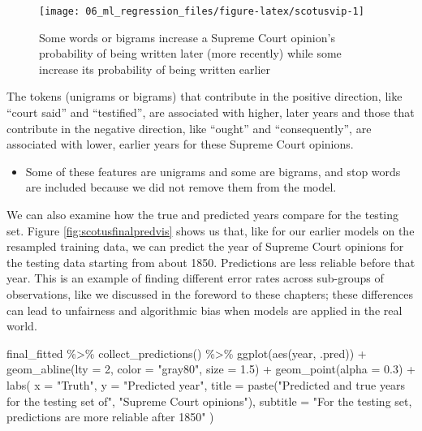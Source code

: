 \documentclass[
]{krantz}
\makeatletter
\newenvironment{Shaded}{\begin{snugshade}}{\end{snugshade}}
\newcommand{\AttributeTok}[1]{\textcolor[rgb]{0.77,0.63,0.00}{#1}}
\newcommand{\DecValTok}[1]{\textcolor[rgb]{0.00,0.00,0.81}{#1}}
\newcommand{\FloatTok}[1]{\textcolor[rgb]{0.00,0.00,0.81}{#1}}
\newcommand{\FunctionTok}[1]{\textcolor[rgb]{0.00,0.00,0.00}{#1}}
\newcommand{\NormalTok}[1]{#1}
\newcommand{\SpecialCharTok}[1]{\textcolor[rgb]{0.00,0.00,0.00}{#1}}
\newcommand{\StringTok}[1]{\textcolor[rgb]{0.31,0.60,0.02}{#1}}
\newenvironment{kframe}{%
\medskip{}
\setlength{\fboxsep}{.8em}
 \def\at@end@of@kframe{}%
 \ifinner\ifhmode%
  \def\at@end@of@kframe{\end{minipage}}%
  \begin{minipage}{\columnwidth}%
 \fi\fi%
 \def\FrameCommand##1{\hskip\@totalleftmargin \hskip-\fboxsep
 \colorbox{shadecolor}{##1}\hskip-\fboxsep
     \hskip-\linewidth \hskip-\@totalleftmargin \hskip\columnwidth}%
 \MakeFramed {\advance\hsize-\width
   \@totalleftmargin\z@ \linewidth\hsize
   \@setminipage}}%
 {\par\unskip\endMakeFramed%
 \at@end@of@kframe}
\renewenvironment{Shaded}{\begin{kframe}}{\end{kframe}}
\newenvironment{rmdblock}[1]
  {\begin{shaded*}
  \begin{itemize}[left = -1cm, labelsep = 1cm]
  \renewcommand{\labelitemi}{
    \raisebox{-.7\height}[0pt][0pt]{
      {\setkeys{Gin}{width=3em,keepaspectratio}\texttt{[image: images/\#1]}}
    }
  }
 
  \item
  }
  {
  \end{itemize}
  \end{shaded*}
  }
\newenvironment{rmdnote}
  {\begin{rmdblock}{note}}
  {\end{rmdblock}}
\makeatother
\begin{document}
\begin{figure}

{\centering \texttt{[image: 06\_ml\_regression\_files/figure-latex/scotusvip-1]} 

}

\caption{Some words or bigrams increase a Supreme Court opinion's probability of being written later (more recently) while some increase its probability of being written earlier}\label{fig:scotusvip}
\end{figure}

The tokens (unigrams or bigrams) that contribute in the positive direction, like ``court said'' and ``testified'', are associated with higher, later years and those that contribute in the negative direction, like ``ought'' and ``consequently'', are associated with lower, earlier years for these Supreme Court opinions.

\begin{rmdnote}
Some of these features are unigrams and some are bigrams, and stop words
are included because we did not remove them from the model.
\end{rmdnote}

We can also examine how the true and predicted years compare for the testing set. Figure \ref{fig:scotusfinalpredvis} shows us that, like for our earlier models on the resampled training data, we can predict the year of Supreme Court opinions for the testing data starting from about 1850. Predictions are less reliable before that year. This is an example of finding different error rates across sub-groups of observations, like we discussed in the foreword to these chapters; these differences can lead to unfairness and algorithmic bias when models are applied in the real world.

\begin{Shaded}
\begin{Highlighting}[]
\NormalTok{final\_fitted }\SpecialCharTok{\%\textgreater{}\%}
  \FunctionTok{collect\_predictions}\NormalTok{() }\SpecialCharTok{\%\textgreater{}\%}
  \FunctionTok{ggplot}\NormalTok{(}\FunctionTok{aes}\NormalTok{(year, .pred)) }\SpecialCharTok{+}
  \FunctionTok{geom\_abline}\NormalTok{(}\AttributeTok{lty =} \DecValTok{2}\NormalTok{, }\AttributeTok{color =} \StringTok{"gray80"}\NormalTok{, }\AttributeTok{size =} \FloatTok{1.5}\NormalTok{) }\SpecialCharTok{+}
  \FunctionTok{geom\_point}\NormalTok{(}\AttributeTok{alpha =} \FloatTok{0.3}\NormalTok{) }\SpecialCharTok{+}
  \FunctionTok{labs}\NormalTok{(}
    \AttributeTok{x =} \StringTok{"Truth"}\NormalTok{,}
    \AttributeTok{y =} \StringTok{"Predicted year"}\NormalTok{,}
    \AttributeTok{title =} \FunctionTok{paste}\NormalTok{(}\StringTok{"Predicted and true years for the testing set of"}\NormalTok{,}
                  \StringTok{"Supreme Court opinions"}\NormalTok{),}
    \AttributeTok{subtitle =} \StringTok{"For the testing set, predictions are more reliable after 1850"}
\NormalTok{  )}
\end{Highlighting}
\end{Shaded}
\end{document}
